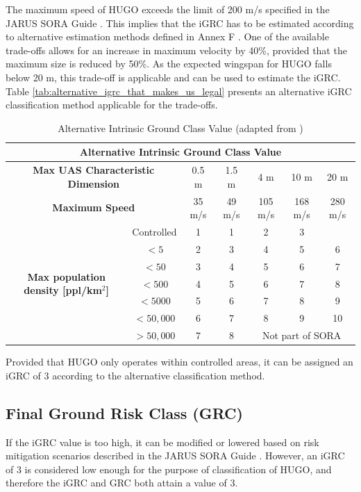 The maximum speed of HUGO exceeds the limit of 200 m/s specified in the JARUS SORA Guide \cite{Jarus_main}. This implies that the iGRC has to be estimated according to alternative estimation methods defined in Annex F \cite{Jarus_Annex_F}. One of the available trade-offs allows for an increase in maximum velocity by 40\%, provided that the maximum size is reduced by 50\%. As the expected wingspan for HUGO falls below 20 m, this trade-off is applicable and can be used to estimate the iGRC. Table \autoref{tab:alternative_igrc_that_makes_us_legal} presents an alternative iGRC classification method applicable for the trade-offs.

\begin{table}[h!]
\centering
\caption{Alternative Intrinsic Ground Class Value (adapted from \cite{Jarus_Annex_F})}
\renewcommand{\arraystretch}{1.3}
\begin{tabular}{|c|c|c|c|c|c|c|}
\hline
\multicolumn{7}{|c|}{\textbf{Alternative Intrinsic Ground Class Value}} \\ \hline
\multicolumn{2}{|c|}{\textbf{Max UAS Characteristic Dimension}} & 0.5 m & 1.5 m & 4 m & 10 m & 20 m \\ \hline
\multicolumn{2}{|c|}{\textbf{Maximum Speed}} & 35 m/s & 49 m/s & 105 m/s & 168 m/s & 280 m/s \\ \hline
\multirow{7}{*}{\textbf{Max population density [ppl/km$^2$]}} 
& Controlled & 1 & 1 & 2 & 3 & \cellcolor{yellow!50}{3} \\ \cline{2-7}
& $< 5$ & 2 & 3 & 4 & 5 & 6 \\ \cline{2-7}
& $< 50$ & 3 & 4 & 5 & 6 & 7 \\ \cline{2-7}
& $< 500$ & 4 & 5 & 6 & 7 & 8 \\ \cline{2-7}
& $< 5000$ & 5 & 6 & 7 & 8 & 9 \\ \cline{2-7}
& $< 50{,}000$ & 6 & 7 & 8 & 9 & 10 \\ \cline{2-7}
& $> 50{,}000$ & 7 & 8 & \multicolumn{3}{c|}{Not part of SORA} \\ \hline
\end{tabular}
\label{tab:alternative_igrc_that_makes_us_legal}
\end{table}

Provided that HUGO only operates within controlled areas, it can be assigned an iGRC of 3 according to the alternative classification method.

\subsection{Final Ground Risk Class (GRC)}
If the iGRC value is too high, it can be modified or lowered based on risk mitigation scenarios described in the JARUS SORA Guide \cite{Jarus_main}. However, an iGRC of 3 is considered low enough for the purpose of classification of HUGO, and therefore the iGRC and GRC both attain a value of 3.



